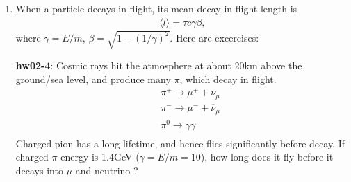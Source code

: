 \documentclass[12pt]{article}
\begin{document}
\begin{enumerate}
{\bf hw02-1}: prove the above identity
and the mean of x is $\mu$,
\begin{eqnarray} 
\langle x\rangle = \int_{-\infty}^{\infty}dx~ xP(x) = \mu
\end{eqnarray} 

{\bf hw02-2}: prove the above identity\\

The probability of x being inside the 1-sigma range,
\begin{eqnarray} 
\mu -\sigma < x < \mu +\sigma
\end{eqnarray} 
is about $67\%$.  When the measurement tells that the true
value of x is in this range, we write\\
\begin{eqnarray} 
x = \mu \pm \sigma.
\end{eqnarray} 

{\bf hw02-3}: please try to show that the above estimate of $67\%$ is fine.\\
\begin{itemize}
  \item hint: If you know numerical integration method, please obtain
  the probability numerically up to 3 digits.  If you don't
  know it, you may draw a curve of P(x) vs x, and try to
  estimate the area under P(x) approximately.  In this
  case, if you can obtain say, about 2/3, it is fine.
\end{itemize}


\item When a particle decays in flight, its mean decay-in-flight
length is\\
\begin{eqnarray} 
\langle l\rangle = \tau c \gamma \beta,
\end{eqnarray} 
where $\gamma = E/m$, $\beta = \sqrt{1-(1/\gamma)^2}$.
Here are excercises:

{\bf hw02-4}:
Cosmic rays hit the atmosphere at about 20km above
the ground/sea level, and produce many $\pi$, which
decay in flight.\\
\begin{eqnarray} 
&&\pi^+ \to \mu^+ + \nu_\mu \\
&&\pi^- \to \mu^- + {\overline \nu_\mu} \\
&&\pi^0 \to \gamma \gamma \\
\end{eqnarray} 
Charged pion has a long lifetime, and hence flies
significantly before decay.  If charged $\pi$ energy
is 1.4GeV ($\gamma = E/m = 10$), how long does it fly
before it decays into $\mu$ and neutrino ?\\


\end{enumerate}
\end{document}
